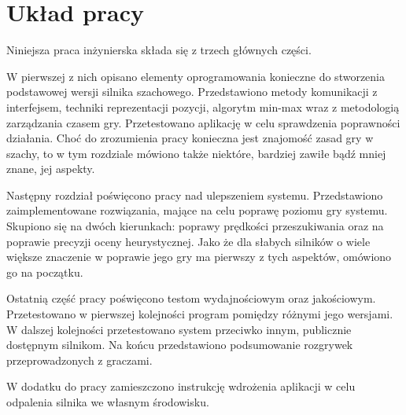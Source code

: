 \section{Układ pracy}
\label{sec:uklad-pracy}

Niniejsza praca inżynierska składa się z trzech głównych części.

W pierwszej z nich opisano elementy oprogramowania konieczne do stworzenia podstawowej wersji silnika szachowego.
Przedstawiono metody komunikacji z interfejsem, techniki reprezentacji pozycji, algorytm min-max wraz z metodologią zarządzania czasem gry.
Przetestowano aplikację w celu sprawdzenia poprawności działania.
Choć do zrozumienia pracy konieczna jest znajomość zasad gry w szachy, to w tym rozdziale mówiono także niektóre, bardziej zawiłe bądź mniej znane, jej aspekty.

Następny rozdział poświęcono pracy nad ulepszeniem systemu.
Przedstawiono zaimplementowane rozwiązania, mające na celu poprawę poziomu gry systemu.
Skupiono się na dwóch kierunkach: poprawy prędkości przeszukiwania oraz na poprawie precyzji oceny heurystycznej.
Jako że dla słabych silników o wiele większe znaczenie w poprawie jego gry ma pierwszy z tych aspektów, omówiono go na początku.


Ostatnią część pracy poświęcono testom wydajnościowym oraz jakościowym.
Przetestowano w pierwszej kolejności program pomiędzy różnymi jego wersjami.
W dalszej kolejności przetestowano system przeciwko innym, publicznie dostępnym silnikom.
Na końcu przedstawiono podsumowanie rozgrywek przeprowadzonych z graczami.

W dodatku do pracy zamieszczono instrukcję wdrożenia aplikacji w celu odpalenia silnika we własnym środowisku.